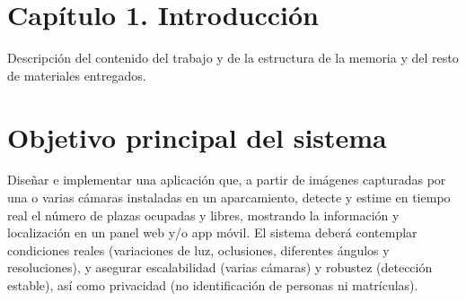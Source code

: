 \documentclass[12pt,a4paper]{article}
\newcommand{\capitulo}[2]{%
	\section*{Capítulo #1. #2}%
}
\begin{document}
	
	\capitulo{1}{Introducción}
	
	Descripción del contenido del trabajo y de la estructura de la memoria y del resto de materiales entregados.
	
	\section{Objetivo principal del sistema}
	
	Diseñar e implementar una aplicación que, a partir de imágenes capturadas por una o varias cámaras instaladas en un aparcamiento, detecte y estime en tiempo real el número de plazas ocupadas y libres, mostrando la información y localización en un panel web y/o app móvil. El sistema deberá contemplar condiciones reales (variaciones de luz, oclusiones, diferentes ángulos y resoluciones), y asegurar escalabilidad (varias cámaras) y robustez (detección estable), así como privacidad (no identificación de personas ni matrículas).
	
\end{document}
